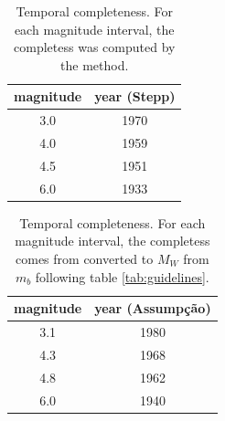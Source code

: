 \documentclass[draft, grl]{agutex}
\begin{document}
\begin{table}[H]
	\caption{Temporal completeness. For each magnitude interval, the completess was computed by the \citet{stepp_1972} method.}
	\begin{tabular}{c c }
		\hline
	\textbf{magnitude} & \textbf{year (Stepp)} \\
		\hline
		3.0 & 1970 \\
		4.0 & 1959 \\
		4.5 & 1951 \\
		6.0 & 1933 \\
		\hline
	\end{tabular}
	\label{tab:completeness_stepp}
\end{table}

\begin{table}[H]
	\caption{Temporal completeness. For each magnitude interval, the completess comes from \citet{assumpcao_et_al_2014} converted to $M_W$ from $m_b$ following table \ref{tab:guidelines}.}
	\begin{tabular}{c c}
		\hline
	\textbf{magnitude} & \textbf{year (Assumpção)} \\
		\hline
		3.1 & 1980 \\
		4.3 & 1968 \\
		4.8 & 1962 \\
		6.0 & 1940 \\
		\hline
	\end{tabular}
	\label{tab:completeness}
\end{table}
\end{document}
